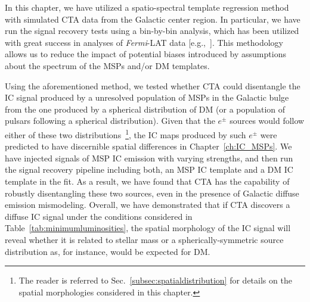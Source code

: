 \documentclass[doublespace,nopageskip]{VTthesis}
\begin{document}
In this chapter, we have utilized a spatio-spectral template regression method with simulated CTA data from the Galactic center region. In particular, we have run the signal recovery tests using a bin-by-bin analysis, which has been utilized with great success in analyses of \textit{Fermi}-LAT data [e.g.,~\citep{2015PhRvL.115w1301A,2017ApJ...840...43A}]. This methodology allows us to reduce the impact of potential biases introduced by assumptions about the spectrum of the MSPs and/or DM templates.
 
Using the aforementioned method, we tested whether CTA could disentangle the IC signal produced by a unresolved population of MSPs in the Galactic bulge from the one produced by a spherical distribution of DM (or a population of pulsars following a spherical distribution). Given that the $e^\pm$ sources would follow either of these two distributions~\footnote{The reader is referred to Sec.~\ref{subsec:spatialdistribution} for details on the spatial morphologies considered in this chapter.}, the IC maps produced by such $e^\pm$ were predicted to have discernible spatial differences in Chapter~\ref{ch:IC_MSPs}. We have injected signals of MSP IC emission with varying strengths, and then run the signal recovery pipeline including both, an MSP IC template and a DM IC template in the fit. As a result, we have found that CTA has the capability of robustly disentangling these two sources, even in the presence of Galactic diffuse emission mismodeling. Overall, we have demonstrated that if CTA discovers a diffuse IC signal under the conditions considered in Table~\ref{tab:minimumluminosities}, the spatial morphology of the IC signal will reveal whether it is related to stellar mass or a spherically-symmetric source distribution as, for instance, would be expected for DM.
\end{document}

